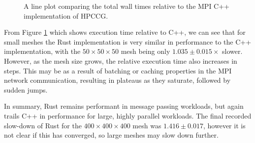 \begin{figure}[H]
    \centering
    
    \caption{A line plot comparing the total wall times relative to the MPI C++ implementation of HPCCG.}
    \label{fig:10_mpi_line_relative}
\end{figure}

From Figure \ref{fig:10_mpi_line_relative} which shows execution time relative to C++, we can see that for small meshes the Rust implementation is very similar in performance to the C++ implementation, with the $50 \times 50 \times 50$ mesh being only $1.035 \pm 0.015 \times$ slower. However, as the mesh size grows, the relative execution time also increases in steps. This may be as a result of batching or caching properties in the MPI network communication, resulting in plateaus as they saturate, followed by sudden jumps. 

In summary, Rust remains performant in message passing workloads, but again trails C++ in performance for large, highly parallel workloads. The final recorded slow-down of Rust for the $400 \times 400 \times 400$ mesh was $1.416 \pm 0.017$, however it is not clear if this has converged, so large meshes may slow down further.




